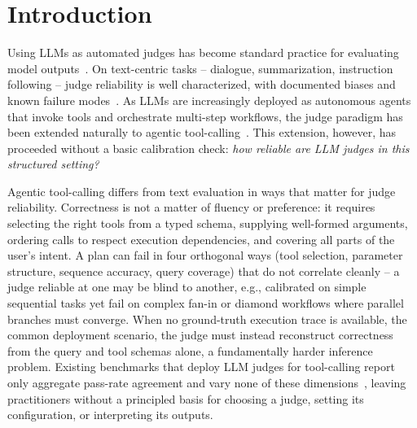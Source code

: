 \vspace{-0.2cm}
\section{Introduction}
\vspace{-0.1cm}
Using LLMs as automated judges has become standard practice for evaluating model outputs~\citep{zheng2023judging,tan2025judgebench,li2024arenahard}. On text-centric tasks -- dialogue, summarization, instruction following -- judge reliability is well characterized, with documented biases and known failure modes~\citep{zheng2023judging,wang2023fair}. As LLMs are increasingly deployed as autonomous agents that invoke tools and orchestrate multi-step workflows, the judge paradigm has been extended naturally to agentic tool-calling~\citep{qin2024toolllm,guo2024stabletoolbench,guo2025mcpagentbench}. This extension, however, has proceeded without a basic calibration check: \emph{how reliable are LLM judges in this structured setting?}

Agentic tool-calling differs from text evaluation in ways that matter for judge reliability. Correctness is not a matter of fluency or preference: it requires selecting the right tools from a typed schema, supplying well-formed arguments, ordering calls to respect execution dependencies, and covering all parts of the user's intent. A plan can fail in four orthogonal ways (tool selection, parameter structure, sequence accuracy, query coverage) that do not correlate cleanly -- a judge reliable at one may be blind to another, e.g., calibrated on simple sequential tasks yet fail on complex fan-in or diamond workflows where parallel branches must converge. When no ground-truth execution trace is available, the common deployment scenario, the judge must instead reconstruct correctness from the query and tool schemas alone, a fundamentally harder inference problem. Existing benchmarks that deploy LLM judges for tool-calling report only aggregate pass-rate agreement and vary none of these dimensions~\citep{qin2024toolllm,guo2024stabletoolbench,guo2025mcpagentbench}, leaving practitioners without a principled basis for choosing a judge, setting its configuration, or interpreting its outputs.

